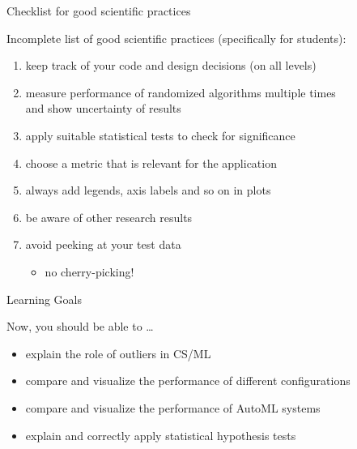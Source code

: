 \begin{frame}[c]{Checklist for good scientific practices}

Incomplete list of good scientific practices (specifically for students):
\begin{enumerate}
	\item keep track of your code and design decisions (on all levels)
	\item measure performance of randomized algorithms multiple times\\
		  and show uncertainty of results
	\item apply suitable statistical tests to check for significance
	\item choose a metric that is relevant for the application
	\item always add legends, axis labels and so on in plots
	\item be aware of other research results
	\item avoid peeking at your test data
	\begin{itemize}
		\item no cherry-picking!
	\end{itemize}
\end{enumerate}

\end{frame}
\begin{frame}[c]{Learning Goals}

Now, you should be able to \ldots

\begin{itemize}
	\item explain the role of outliers in CS/ML
	\item compare and visualize the performance of different configurations
	\item compare and visualize the performance of AutoML systems
	\item explain and correctly apply statistical hypothesis tests\end{itemize}
\end{frame}
